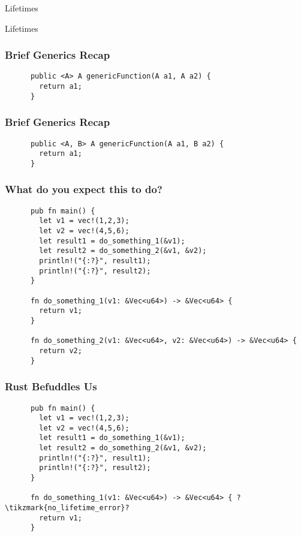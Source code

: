 \begin{section}{Lifetimes}


  \begin{frame}
    \centerline{
      \huge{Lifetimes}
    }
  \end{frame}

  \begin{frame}[fragile]
    \frametitle{Brief Generics Recap}
    \begin{verbatim}
      public <A> A genericFunction(A a1, A a2) {
        return a1;
      }
    \end{verbatim}
  \end{frame}

  \begin{frame}[fragile]
    \frametitle{Brief Generics Recap}
    \begin{verbatim}
      public <A, B> A genericFunction(A a1, B a2) {
        return a1;
      }
    \end{verbatim}
  \end{frame}

  \begin{frame}[fragile]
    \frametitle{What do you expect this to do? \cite{RustLangEd}}
    \begin{verbatim}
      pub fn main() {
        let v1 = vec!(1,2,3);
        let v2 = vec!(4,5,6);
        let result1 = do_something_1(&v1);
        let result2 = do_something_2(&v1, &v2);
        println!("{:?}", result1);
        println!("{:?}", result2);
      }

      fn do_something_1(v1: &Vec<u64>) -> &Vec<u64> {
        return v1;
      }

      fn do_something_2(v1: &Vec<u64>, v2: &Vec<u64>) -> &Vec<u64> {
        return v2;
      }
    \end{verbatim}
  \end{frame}

  \begin{frame}[fragile]
    \frametitle{Rust Befuddles Us}
    \begin{verbatim}
      pub fn main() {
        let v1 = vec!(1,2,3);
        let v2 = vec!(4,5,6);
        let result1 = do_something_1(&v1);
        let result2 = do_something_2(&v1, &v2);
        println!("{:?}", result1);
        println!("{:?}", result2);
      }

      fn do_something_1(v1: &Vec<u64>) -> &Vec<u64> { ?\tikzmark{no_lifetime_error}?
        return v1;
      }


\end{verbatim}
\end{frame}
\end{section}
